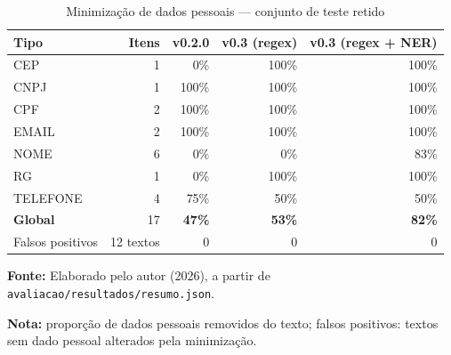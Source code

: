 \begin{table}[htbp]
\caption{Minimização de dados pessoais --- conjunto de teste retido}\label{tab:minimizacao_teste}
\centering\small
\setlength{\tabcolsep}{4pt}
\begin{tabular}{lrrrr}
\toprule
Tipo & Itens & v0.2.0 & v0.3 (regex) & v0.3 (regex + NER) \\
\midrule
CEP & 1 & 0\% & 100\% & 100\% \\
CNPJ & 1 & 100\% & 100\% & 100\% \\
CPF & 2 & 100\% & 100\% & 100\% \\
EMAIL & 2 & 100\% & 100\% & 100\% \\
NOME & 6 & 0\% & 0\% & 83\% \\
RG & 1 & 0\% & 100\% & 100\% \\
TELEFONE & 4 & 75\% & 50\% & 50\% \\
\textbf{Global} & 17 & \textbf{47\%} & \textbf{53\%} & \textbf{82\%} \\
Falsos positivos & 12 textos & 0 & 0 & 0 \\
\bottomrule
\end{tabular}
\par\smallskip
\begin{minipage}{\linewidth}{\small \textbf{Fonte:} Elaborado pelo autor (2026), a partir de \texttt{avaliacao/resultados/resumo.json}.}\par
{\small \textbf{Nota:} proporção de dados pessoais removidos do texto; falsos positivos: textos sem dado pessoal alterados pela minimização.}\end{minipage}
\end{table}
